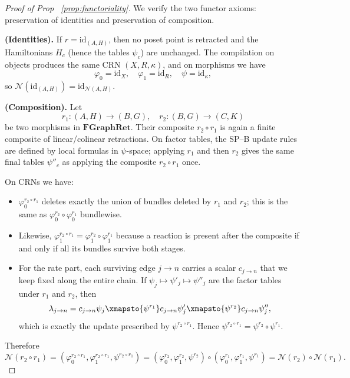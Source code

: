 \documentclass{article}
\theoremstyle{plain}
\theoremstyle{definition}
\theoremstyle{remark}
\newcommand{\<}{\langle}
\renewcommand{\>}{\rangle}
\begin{document}
\begin{proof}[Proof of Prop ~\ref{prop:functoriality}]
We verify the two functor axioms: preservation of identities and preservation of composition.

\medskip
\noindent\textbf{(Identities).} 
If $r = \mathrm{id}_{(A,H)}$, then no poset point is retracted and the Hamiltonians $H_c$ 
(hence the tables $\psi_c$) are unchanged. The compilation on objects produces the same 
CRN $(X, R, \kappa)$, and on morphisms we have
\[
\varphi_0 = \mathrm{id}_X, \quad \varphi_1 = \mathrm{id}_R, \quad \psi = \mathrm{id}_\kappa,
\]
so $\mathcal{N}(\mathrm{id}_{(A,H)}) = \mathrm{id}_{\mathcal{N}(A,H)}$.

\medskip
\noindent\textbf{(Composition).} 
Let
\[
r_1 : (A, H) \to (B, G), \quad r_2 : (B, G) \to (C, K)
\]
be two morphisms in $\mathbf{FGraphRet}$. Their composite $r_2 \circ r_1$ is again a 
finite composite of linear/colinear retractions. On factor tables, the SP--B update 
rules are defined by local formulas in $\psi$-space; applying $r_1$ and then $r_2$ 
gives the same final tables $\psi''_c$ as applying the composite $r_2 \circ r_1$ once.

On CRNs we have:
\begin{itemize}
\item $\varphi_0^{r_2 \circ r_1}$ deletes exactly the union of bundles deleted by $r_1$ 
and $r_2$; this is the same as $\varphi_0^{r_2} \circ \varphi_0^{r_1}$ bundlewise.

\item Likewise, $\varphi_1^{r_2 \circ r_1} = \varphi_1^{r_2} \circ \varphi_1^{r_1}$ 
because a reaction is present after the composite if and only if all its bundles 
survive both stages.

\item For the rate part, each surviving edge $j \to n$ carries a scalar $c_{j \to n}$ 
that we keep fixed along the entire chain. If $\psi_j \mapsto \psi'_j \mapsto \psi''_j$ 
are the factor tables under $r_1$ and $r_2$, then
\[
\lambda_{j \to n} = c_{j \to n} \psi_j 
\xmapsto{\psi^{r_1}} c_{j \to n} \psi'_j 
\xmapsto{\psi^{r_2}} c_{j \to n} \psi''_j,
\]
which is exactly the update prescribed by $\psi^{r_2 \circ r_1}$. Hence 
$\psi^{r_2 \circ r_1} = \psi^{r_2} \circ \psi^{r_1}$.
\end{itemize}

Therefore
\[
\mathcal{N}(r_2 \circ r_1) = (\varphi_0^{r_2 \circ r_1}, \varphi_1^{r_2 \circ r_1}, \psi^{r_2 \circ r_1}) 
= (\varphi_0^{r_2}, \varphi_1^{r_2}, \psi^{r_2}) \circ (\varphi_0^{r_1}, \varphi_1^{r_1}, \psi^{r_1}) 
= \mathcal{N}(r_2) \circ \mathcal{N}(r_1).
\]


\end{proof}
\end{document}
